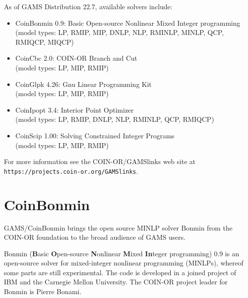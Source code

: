 As of GAMS Distribution 22.7, available solvers include:
\begin{itemize}
\item CoinBonmin 0.9: Basic Open-source Nonlinear Mixed Integer programming\\
(model types: LP, RMIP, MIP, DNLP, NLP, RMINLP, MINLP, QCP, RMIQCP, MIQCP)
\item CoinCbc 2.0: COIN-OR Branch and Cut\\
(model types: LP, MIP, RMIP)
\item CoinGlpk 4.26: Gnu Linear Programming Kit\\
(model types: LP, MIP, RMIP)
\item CoinIpopt 3.4: Interior Point Optimizer\\
(model types: LP, RMIP, DNLP, NLP, RMINLP, QCP, RMIQCP)
\item CoinScip 1.00: Solving Constrained Integer Programs\\
(model types: LP, MIP, RMIP)
\end{itemize}

% 

For more information see the COIN-OR/GAMSlinks web site at
\texttt{https://projects.coin-or.org/GAMSlinks}.

\section{CoinBonmin}

GAMS/CoinBonmin brings the open source MINLP solver Bonmin from the COIN-OR foundation to the broad audience of GAMS users.

Bonmin (\textbf{B}asic \textbf{O}pen-source \textbf{N}onlinear \textbf{M}ixed \textbf{In}teger programming) 0.9 is an open-source solver for mixed-integer nonlinear programming (MINLPs), whereof some parts are still experimental.
The code is developed in a joined project of IBM and the Carnegie Mellon University.
The COIN-OR project leader for Bonmin is Pierre Bonami.

